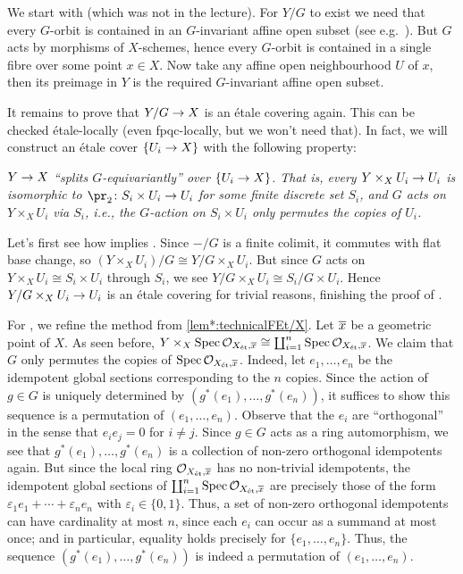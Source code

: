 \begin{proof*}
	We start with  (which was not in the lecture). For $Y/G$ to exist we need that every $G$-orbit is contained in an $G$-invariant affine open subset (see e.g.\ \cite[Theorem~11]{jacobians}). But $G$ acts by morphisms of $X$-schemes, hence every $G$-orbit is contained in a single fibre over some point $x\in X$. Now take any affine open neighbourhood $U$ of $x$, then its preimage in $Y$ is the required $G$-invariant affine open subset.
	
	It remains to prove that $Y/G\morphism X$ is an étale covering again. This can be checked étale-locally (even fpqc-locally, but we won't need that). In fact, we will construct an étale cover $\{U_i\morphism X\}$ with the following property:
	\begin{alphanumerate}
		\item[\itememph{*}] \itshape $Y\morphism X$ \enquote{splits $G$-equivariantly} over $\{U_i\morphism X\}$. That is, every $Y\times_XU_i\morphism U_i$ is isomorphic to $\pr_2\colon S_i\times U_i\morphism U_i$ for some finite discrete set $S_i$, and $G$ acts on $Y\times_XU_i$ via $S_i$, i.e., the $G$-action on $S_i\times U_i$ only permutes the copies of $U_i$.
	\end{alphanumerate}
	Let's first see how \itememph{*} implies . Since $-/G$ is a finite colimit, it commutes with flat base change, so $(Y\times_XU_i)/G\cong Y/G\times_XU_i$. But since $G$ acts on $Y\times_XU_i\cong S_i\times U_i$  through $S_i$, we see $Y/G\times_XU_i\cong S_i/G\times U_i$. Hence $Y/G\times_XU_i\morphism U_i$ is an étale covering for trivial reasons, finishing the proof of .
	
	For \itememph{*}, we refine the method from \cref{lem*:technicalFEt/X}. Let $\ov{x}$ be a geometric point of $X$. As seen before, $Y\times_X\Spec \Oo_{X_\et,\ov{x}}\cong \coprod_{i=1}^n\Spec \Oo_{X_\et,\ov{x}}$. We claim that $G$ only permutes the copies of $\Spec \Oo_{X_\et,\ov{x}}$. Indeed, let $e_1,\ldots,e_n$ be the idempotent global sections corresponding to the $n$ copies. Since the action of $g\in G$ is uniquely determined by $(g^*(e_1),\dotsc,g^*(e_n))$, it suffices to show this sequence is a permutation of $(e_1,\dotsc,e_n)$. Observe that the $e_i$ are \enquote{orthogonal} in the sense that $e_ie_j=0$ for $i\neq j$. Since $g\in G$ acts as a ring automorphism, we see that $g^*(e_1),\dotsc,g^*(e_n)$ is a collection of non-zero orthogonal idempotents again. But since the local ring $\Oo_{X_\et,\ov{x}}$ has no non-trivial idempotents, the idempotent global sections of $\coprod_{i=1}^n\Spec \Oo_{X_\et,\ov{x}}$ are precisely those of the form $\varepsilon_1e_1+\dotsb+\varepsilon_ne_n$ with $\varepsilon_i\in\{0,1\}$. Thus, a set of non-zero orthogonal idempotents can have cardinality at most $n$, since each $e_i$ can occur as a summand at most once; and in particular, equality holds precisely for $\{e_1,\dotsc,e_n\}$. Thus, the sequence $(g^*(e_1),\dotsc,g^*(e_n))$ is indeed a permutation of $(e_1,\dotsc,e_n)$.
	

\end{proof*}

